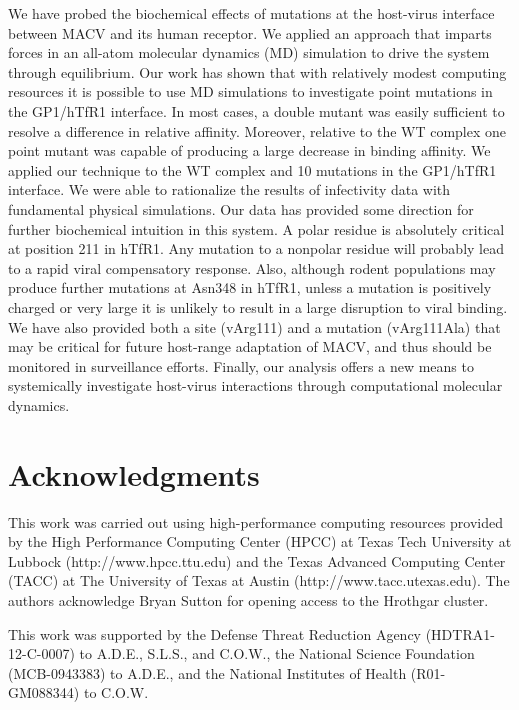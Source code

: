 \documentclass[12pt]{article}
\begin{document}
We have probed the biochemical effects of mutations at the host-virus interface between MACV and its human receptor. We applied an approach that imparts forces in an all-atom molecular dynamics (MD) simulation to drive the system through equilibrium. Our work has shown that with relatively modest computing resources it is possible to use MD simulations to investigate point mutations in the GP1/hTfR1 interface. In most cases, a double mutant was easily sufficient to resolve a difference in relative affinity. Moreover, relative to the WT complex one point mutant was capable of producing a large decrease in binding affinity. We applied our technique to the WT complex and 10 mutations in the GP1/hTfR1 interface. We were able to rationalize the results of infectivity data with fundamental physical simulations. Our data has provided some direction for further biochemical intuition in this system. A polar residue is absolutely critical at position 211 in hTfR1. Any mutation to a nonpolar residue will probably lead to a rapid viral compensatory response. Also, although rodent populations may produce further mutations at Asn348 in hTfR1, unless a mutation is positively charged or very large it is unlikely to result in a large disruption to viral binding. We have also provided both a site (vArg111) and a mutation (vArg111Ala) that may be critical for future host-range adaptation of MACV, and thus should be monitored in surveillance efforts. Finally, our analysis offers a new means to systemically investigate host-virus interactions through computational molecular dynamics.

\section*{Acknowledgments}
This work was carried out using high-performance computing resources provided by the High Performance Computing Center (HPCC) at Texas Tech University at Lubbock (http://www.hpcc.ttu.edu) and the Texas Advanced Computing Center (TACC) at The University of Texas at Austin (http://www.tacc.utexas.edu). The authors acknowledge Bryan Sutton for opening access to the Hrothgar cluster.

This work was supported by the Defense Threat Reduction Agency (HDTRA1-12-C-0007) to A.D.E., S.L.S., and C.O.W., the National Science Foundation (MCB-0943383) to A.D.E., and the National Institutes of Health (R01-GM088344) to C.O.W.



\end{document}
